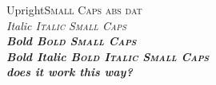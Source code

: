 \documentclass[11pt]{article}
\begin{document}
Upright{\scshape Small Caps abs dat}\\
\itshape Italic {\scshape Italic Small Caps}\\
\upshape\bfseries Bold {\scshape Bold Small Caps}\\
\itshape Bold Italic {\scshape Bold Italic Small Caps}\\
\textit{does it work this way?}
\end{document}
